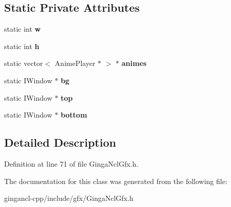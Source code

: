 \subsection*{Static Private Attributes}
\begin{CompactItemize}
\item 
static int {\bf w}\label{classbr_1_1pucrio_1_1telemidia_1_1ginga_1_1ncl_1_1GingaNclGfx_ac374e320caaadeca4874add33b62af2}

\item 
static int {\bf h}\label{classbr_1_1pucrio_1_1telemidia_1_1ginga_1_1ncl_1_1GingaNclGfx_16611451551e3d15916bae723c3f59f7}

\item 
static vector$<$ AnimePlayer $\ast$ $>$ $\ast$ {\bf animes}\label{classbr_1_1pucrio_1_1telemidia_1_1ginga_1_1ncl_1_1GingaNclGfx_be6fe51fb86ae5b2e4a3f2b6d08f8a33}

\item 
static IWindow $\ast$ {\bf bg}\label{classbr_1_1pucrio_1_1telemidia_1_1ginga_1_1ncl_1_1GingaNclGfx_6afed1ff3aa539c820036a2b2fa4b58e}

\item 
static IWindow $\ast$ {\bf top}\label{classbr_1_1pucrio_1_1telemidia_1_1ginga_1_1ncl_1_1GingaNclGfx_965c29ab95332c66785eeef0fa31b8ae}

\item 
static IWindow $\ast$ {\bf bottom}\label{classbr_1_1pucrio_1_1telemidia_1_1ginga_1_1ncl_1_1GingaNclGfx_9ae4a4da95e935109cf3bf28c3b7b3cd}

\end{CompactItemize}


\subsection{Detailed Description}




Definition at line 71 of file GingaNclGfx.h.

The documentation for this class was generated from the following file:\begin{CompactItemize}
\item 
gingancl-cpp/include/gfx/GingaNclGfx.h\end{CompactItemize}
